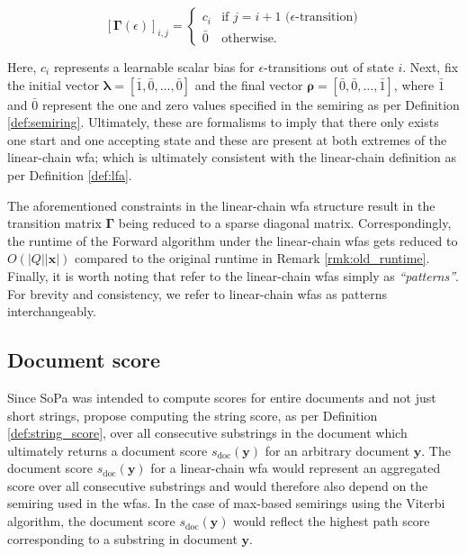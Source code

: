 \begin{equation}
  \label{eq:sopa_transition_matrix_epsilon}
  [\bm{\Gamma}(\epsilon)]_{i,j} =
  \begin{cases}
    c_i  & \text{if } j = i + 1 \text{ ($\epsilon$-transition)} \\
    \bar{0} & \text{otherwise.}
  \end{cases}
\end{equation}

Here, $c_i$ represents a learnable scalar bias for $\epsilon$-transitions out of
state $i$. Next, \citet{schwartz2018sopa} fix the initial vector $\bm{\lambda} =
[\bar{1}, \bar{0}, \ldots, \bar{0}]$ and the final vector $\bm{\rho} = [\bar{0},
\bar{0}, \ldots, \bar{1}]$, where $\bar{1}$ and $\bar{0}$ represent the one and
zero values specified in the semiring as per Definition \ref{def:semiring}.
Ultimately, these are formalisms to imply that there only exists one start and
one accepting state and these are present at both extremes of the linear-chain
\ac{wfa}; which is ultimately consistent with the linear-chain definition as per Definition
\ref{def:lfa}.

The aforementioned constraints in the linear-chain \ac{wfa} structure result in the
transition matrix $\bm{\Gamma}$ being reduced to a sparse diagonal matrix.
Correspondingly, the runtime of the Forward algorithm under the linear-chain
\ac{wfas} gets reduced to $O(|Q||\bm{x}|)$ compared to the original runtime in
Remark \ref{rmk:old_runtime}. Finally, it is worth noting that \citet[Page 3,
Section 3.1]{schwartz2018sopa} refer to the linear-chain \ac{wfas} simply as
\textit{``patterns''}. For brevity and consistency, we refer to linear-chain
\ac{wfas} as patterns interchangeably.

\subsection{Document score}

\label{section:sopa_doc_score}

Since SoPa was intended to compute scores for entire documents and not just
short strings, \citet[Page 3, Section 3.2]{schwartz2018sopa} propose computing
the string score, as per Definition \ref{def:string_score}, over all consecutive
substrings in the document which ultimately returns a document score
$s_{\text{doc}}(\bm{y})$ for an arbitrary document $\bm{y}$. The document score
$s_{\text{doc}}(\bm{y})$ for a linear-chain \ac{wfa} would represent an
aggregated score over all consecutive substrings and would therefore also depend
on the semiring used in the \ac{wfas}. In the case of max-based semirings using
the Viterbi algorithm, the document score $s_{\text{doc}}(\bm{y})$ would reflect
the highest path score corresponding to a substring in document $\bm{y}$.

